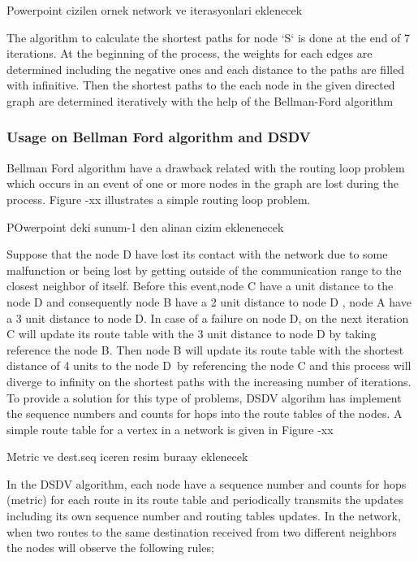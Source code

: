 \documentclass[twoside]{article}
\begin{document}
	Powerpoint cizilen ornek network ve iterasyonlari eklenecek
	
	The algorithm to calculate the shortest paths for node `S` is done at the end of 7 iterations. At the beginning of the process, the weights for each edges are determined including the negative ones and each distance to the paths are filled with infinitive. Then the shortest paths to the each node in the given directed graph are determined iteratively with the help of the Bellman-Ford algorithm 
	
	
	\subsubsection{Usage on Bellman Ford algorithm and DSDV}
	
	Bellman Ford algorithm have a drawback related with the routing loop problem which occurs in an event of one or more nodes in the graph are lost during the process. Figure -xx illustrates a simple routing loop problem. 
	
	POwerpoint deki sunum-1 den alinan cizim eklenenecek
	
	Suppose that the node D have lost its contact with the network due to some malfunction or being lost by getting outside of the communication range to the closest neighbor of itself. Before this event,node C have a unit distance to the node D and consequently node B have a 2 unit distance to node D , node A have a 3 unit distance to node D. In case of a failure on node D, on the next iteration C will update its route table with the 3 unit distance to node D by taking reference the node B. Then node B will update its route table with the shortest distance of 4 units to the node D\ by referencing the node C and this process will diverge to infinity on the shortest paths with the increasing number of iterations. To provide a solution for this type of problems, DSDV algorihm has implement the sequence numbers and counts for hops into the route tables of the nodes. A simple route table for a vertex in a network is given in Figure -xx
	
	Metric ve dest.seq iceren resim buraay eklenecek
	
	In the DSDV algorithm, each node have a sequence number and counts for hops (metric) for each route in its route table and periodically transmits the updates including its own sequence number and routing tables updates. In the network, when two routes to the same destination received from two different neighbors the nodes will observe the following rules;
	
\end{document}
